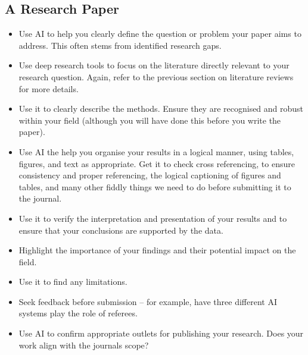 \documentclass[
  10t,
]{article}
\providecommand{\tightlist}{%
  \setlength{\itemsep}{0pt}\setlength{\parskip}{0pt}}
\begin{document}
\subsection{A Research Paper}\label{a-research-paper}

\begin{itemize}
\tightlist
\item
  Use AI to help you clearly define the question or problem your paper
  aims to address. This often stems from identified research gaps.
\item
  Use deep research tools to focus on the literature directly relevant
  to your research question. Again, refer to the previous section on
  literature reviews for more details.
\item
  Use it to clearly describe the methods. Ensure they are recognised and
  robust within your field (although you will have done this before you
  write the paper).
\item
  Use AI the help you organise your results in a logical manner, using
  tables, figures, and text as appropriate. Get it to check cross
  referencing, to ensure consistency and proper referencing, the logical
  captioning of figures and tables, and many other fiddly things we need
  to do before submitting it to the journal.
\item
  Use it to verify the interpretation and presentation of your results
  and to ensure that your conclusions are supported by the data.
\item
  Highlight the importance of your findings and their potential impact
  on the field.
\item
  Use it to find any limitations.
\item
  Seek feedback before submission -- for example, have three different
  AI systems play the role of referees.
\item
  Use AI to confirm appropriate outlets for publishing your research.
  Does your work align with the journals scope?
\end{itemize}
\end{document}
